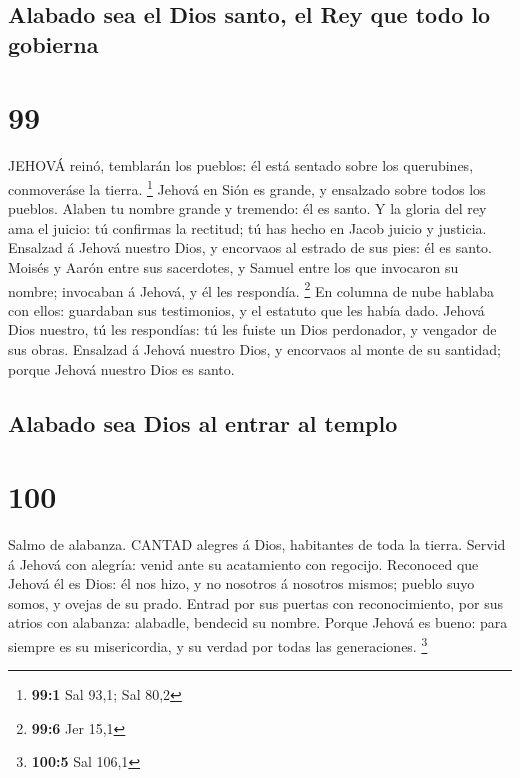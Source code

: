 \hypertarget{alabado-sea-el-dios-santo-el-rey-que-todo-lo-gobierna}{%
\subsection{Alabado sea el Dios santo, el Rey que todo lo
gobierna}\label{alabado-sea-el-dios-santo-el-rey-que-todo-lo-gobierna}}

\hypertarget{section-98}{%
\section{99}\label{section-98}}

 JEHOVÁ reinó, temblarán los pueblos: él está sentado sobre
los querubines, conmoveráse la tierra. \footnote{\textbf{99:1} Sal 93,1;
  Sal 80,2}  Jehová en Sión es grande, y ensalzado sobre
todos los pueblos.  Alaben tu nombre grande y tremendo: él
es santo.  Y la gloria del rey ama el juicio: tú confirmas
la rectitud; tú has hecho en Jacob juicio y justicia. 
Ensalzad á Jehová nuestro Dios, y encorvaos al estrado de sus pies: él
es santo.  Moisés y Aarón entre sus sacerdotes, y Samuel
entre los que invocaron su nombre; invocaban á Jehová, y él les
respondía. \footnote{\textbf{99:6} Jer 15,1}  En columna de
nube hablaba con ellos: guardaban sus testimonios, y el estatuto que les
había dado.  Jehová Dios nuestro, tú les respondías: tú les
fuiste un Dios perdonador, y vengador de sus obras. 
Ensalzad á Jehová nuestro Dios, y encorvaos al monte de su santidad;
porque Jehová nuestro Dios es santo.

\hypertarget{alabado-sea-dios-al-entrar-al-templo}{%
\subsection{Alabado sea Dios al entrar al
templo}\label{alabado-sea-dios-al-entrar-al-templo}}

\hypertarget{section-99}{%
\section{100}\label{section-99}}

 Salmo de alabanza. CANTAD alegres á Dios, habitantes de
toda la tierra.  Servid á Jehová con alegría: venid ante su
acatamiento con regocijo.  Reconoced que Jehová él es Dios:
él nos hizo, y no nosotros á nosotros mismos; pueblo suyo somos, y
ovejas de su prado.  Entrad por sus puertas con
reconocimiento, por sus atrios con alabanza: alabadle, bendecid su
nombre.  Porque Jehová es bueno: para siempre es su
misericordia, y su verdad por todas las generaciones. \footnote{\textbf{100:5}
  Sal 106,1}

